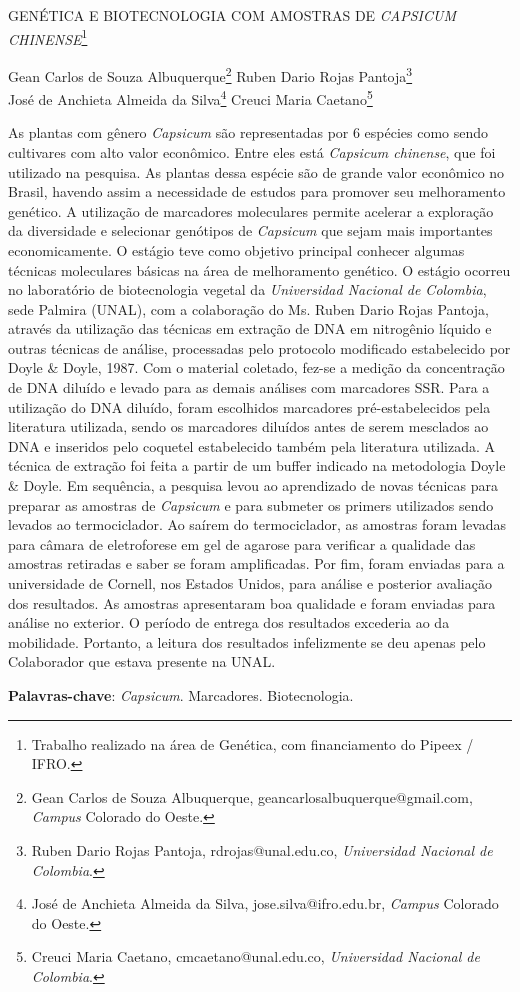 \documentclass[article,12pt,onesidea,4paper,english,brazil]{abntex2}
\begin{document}
	
	
	\frenchspacing 
	
	\begin{center}
		\LARGE GENÉTICA E BIOTECNOLOGIA COM AMOSTRAS DE \textit{\MakeUppercase{Capsicum chinense}}\footnote{Trabalho realizado na área de Genética, com financiamento do Pipeex / IFRO.}
		
		\normalsize
		Gean Carlos de Souza Albuquerque\footnote{Gean Carlos de Souza Albuquerque, geancarlosalbuquerque@gmail.com, \textit{Campus} Colorado do	Oeste.} 
		Ruben Dario Rojas Pantoja\footnote{Ruben Dario Rojas Pantoja, rdrojas@unal.edu.co, \textit{Universidad Nacional de Colombia}.} \\
		José de Anchieta Almeida da Silva\footnote{José de Anchieta Almeida da Silva, jose.silva@ifro.edu.br, \textit{Campus} Colorado do Oeste.} 
		Creuci Maria Caetano\footnote{Creuci Maria Caetano, cmcaetano@unal.edu.co, \textit{Universidad Nacional de Colombia}.} 
	\end{center}
	
	\noindent As plantas com gênero \textit{Capsicum} são representadas por 6 espécies como sendo
	cultivares com alto valor econômico. Entre eles está \textit{Capsicum chinense}, que foi
	utilizado na pesquisa. As plantas dessa espécie são de grande valor econômico no
	Brasil, havendo assim a necessidade de estudos para promover seu melhoramento
	genético. A utilização de marcadores moleculares permite acelerar a exploração da
	diversidade e selecionar genótipos de \textit{Capsicum} que sejam mais importantes
	economicamente. O estágio teve como objetivo principal conhecer algumas técnicas
	moleculares básicas na área de melhoramento genético. O estágio ocorreu no
	laboratório de biotecnologia vegetal da \textit{Universidad Nacional de Colombia}, sede
	Palmira (UNAL), com a colaboração do Ms. Ruben Dario Rojas Pantoja, através da
	utilização das técnicas em extração de DNA em nitrogênio líquido e outras técnicas
	de análise, processadas pelo protocolo modificado estabelecido por Doyle \& Doyle,
	1987. Com o material coletado, fez-se a medição da concentração de DNA diluído e
	levado para as demais análises com marcadores SSR. Para a utilização do DNA
	diluído, foram escolhidos marcadores pré-estabelecidos pela literatura utilizada,
	sendo os marcadores diluídos antes de serem mesclados ao DNA e inseridos pelo
	coquetel estabelecido também pela literatura utilizada. A técnica de extração foi feita
	a partir de um buffer indicado na metodologia Doyle \& Doyle. Em sequência, a
	pesquisa levou ao aprendizado de novas técnicas para preparar as amostras de
	\textit{Capsicum} e para submeter os primers utilizados sendo levados ao termociclador. Ao
	saírem do termociclador, as amostras foram levadas para câmara de eletroforese em
	gel de agarose para verificar a qualidade das amostras retiradas e saber se foram
	amplificadas. Por fim, foram enviadas para a universidade de Cornell, nos Estados
	Unidos, para análise e posterior avaliação dos resultados. As amostras
	apresentaram boa qualidade e foram enviadas para análise no exterior. O período
	de entrega dos resultados excederia ao da mobilidade. Portanto, a leitura dos
	resultados infelizmente se deu apenas pelo Colaborador que estava presente na
	UNAL.
	
	\vspace{\onelineskip}
	
	\noindent
	\textbf{Palavras-chave}: \textit{Capsicum}. Marcadores. Biotecnologia.
	
\end{document}
